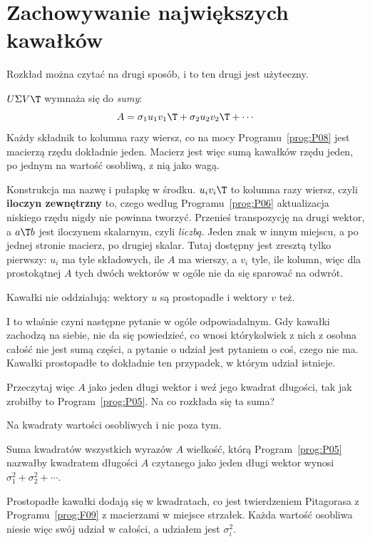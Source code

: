 \section{Zachowywanie największych kawałków}
\label{sec:P11-lowrank}

\begin{fr}
Rozkład można czytać na drugi sposób, i to ten drugi jest użyteczny.

$U\Sigma V\T$ wymnaża się do \emph{sumy}:
\[ A = \sigma_1 u_1v_1\T + \sigma_2u_2v_2\T + \cdots \]
Każdy składnik to kolumna razy wiersz, co na mocy Programu~\ref{prog:P08} jest
macierzą rzędu dokładnie jeden. Macierz jest więc sumą kawałków rzędu jeden, po
jednym na wartość osobliwą, z nią jako wagą.

Konstrukcja ma nazwę i pułapkę w środku. $u_i v_i\T$ to kolumna razy wiersz,
czyli \textbf{iloczyn zewnętrzny} \dash{} to, czego według
Programu~\ref{prog:P06} aktualizacja niskiego rzędu nigdy nie powinna tworzyć.
Przenieś transpozycję na drugi wektor, a $a\T b$ jest iloczynem skalarnym,
czyli \emph{liczbą}. Jeden znak w innym miejscu, a po jednej stronie macierz,
po drugiej skalar. Tutaj dostępny jest zresztą tylko pierwszy: $u_i$ ma tyle
składowych, ile $A$ ma wierszy, a $v_i$ tyle, ile kolumn, więc dla prostokątnej
$A$ tych dwóch wektorów w ogóle nie da się sparować na odwrót.

Kawałki nie oddziałują: wektory $u$ są prostopadłe i wektory $v$ też.

I to właśnie czyni następne pytanie w ogóle odpowiadalnym. Gdy kawałki
zachodzą na siebie, nie da się powiedzieć, co wnosi którykolwiek z nich z
osobna \dash{} całość nie jest sumą części, a pytanie o udział jest pytaniem o
coś, czego nie ma. Kawałki prostopadłe to dokładnie ten przypadek, w którym
udział istnieje.

Przeczytaj więc $A$ jako jeden długi wektor i weź jego kwadrat długości, tak
jak zrobiłby to Program~\ref{prog:P05}. Na co rozkłada się ta suma?
\dotline
\nextframe
\end{fr}

\begin{fr}
\begin{ansblock}
Na kwadraty wartości osobliwych i nic poza tym.
\end{ansblock}

Suma kwadratów wszystkich wyrazów $A$ \dash{} wielkość, którą
Program~\ref{prog:P05} nazwałby kwadratem długości $A$ czytanego jako jeden
długi wektor \dash{} wynosi $\sigma_1^{2} + \sigma_2^{2} + \cdots$.

Prostopadłe kawałki dodają się w kwadratach, co jest twierdzeniem Pitagorasa z
Programu~\ref{prog:F09} z macierzami w miejsce strzałek. Każda wartość osobliwa
niesie więc swój udział w całości, a udziałem jest $\sigma_i^{2}$.
\end{fr}

